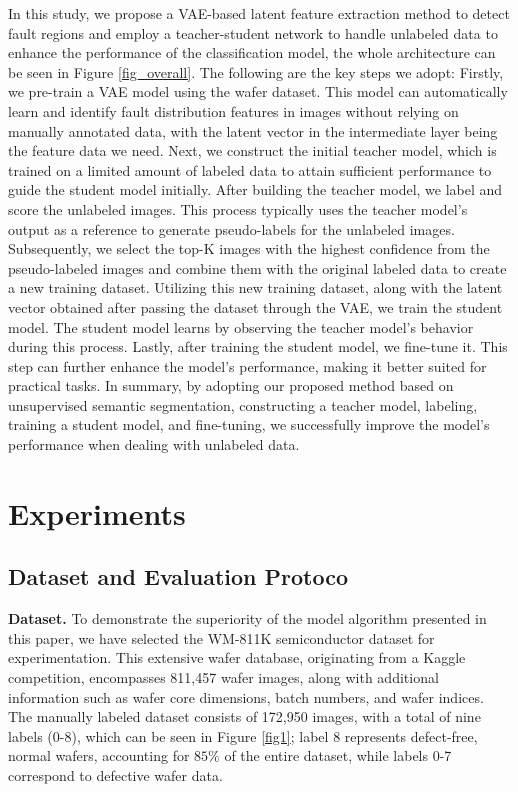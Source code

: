 \documentclass[conference]{IEEEtran}
\begin{document}
In this study, we propose a VAE-based latent feature extraction method to detect fault regions and employ a teacher-student network to handle unlabeled data to enhance the performance of the classification model, the whole architecture can be seen in Figure \ref{fig_overall}. The following are the key steps we adopt: Firstly, we pre-train a VAE model using the wafer dataset. This model can automatically learn and identify fault distribution features in images without relying on manually annotated data, with the latent vector in the intermediate layer being the feature data we need. Next, we construct the initial teacher model, which is trained on a limited amount of labeled data to attain sufficient performance to guide the student model initially.
After building the teacher model, we label and score the unlabeled images. This process typically uses the teacher model's output as a reference to generate pseudo-labels for the unlabeled images. Subsequently, we select the top-K images with the highest confidence from the pseudo-labeled images and combine them with the original labeled data to create a new training dataset. Utilizing this new training dataset, along with the latent vector obtained after passing the dataset through the VAE, we train the student model. The student model learns by observing the teacher model's behavior during this process.
Lastly, after training the student model, we fine-tune it. This step can further enhance the model's performance, making it better suited for practical tasks. In summary, by adopting our proposed method based on unsupervised semantic segmentation, constructing a teacher model, labeling, training a student model, and fine-tuning, we successfully improve the model's performance when dealing with unlabeled data.



\section{Experiments}

\subsection{Dataset and Evaluation Protoco}

{\bf Dataset.} To demonstrate the superiority of the model algorithm presented in this paper, we have selected the WM-811K semiconductor dataset for experimentation. This extensive wafer database, originating from a Kaggle competition, encompasses 811,457 wafer images, along with additional information such as wafer core dimensions, batch numbers, and wafer indices. The manually labeled dataset consists of 172,950 images, with a total of nine labels (0-8), which can be seen in Figure \ref{fig1}; label 8 represents defect-free, normal wafers, accounting for $85\%$ of the entire dataset, while labels 0-7 correspond to defective wafer data.
\end{document}
